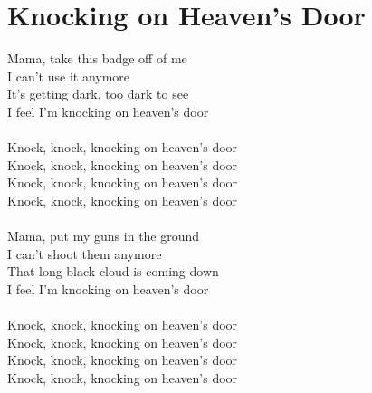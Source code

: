 \section{Knocking on Heaven's Door}
Mama, take this badge off of me\\
I can’t use it anymore\\
It’s getting dark, too dark to see\\
I feel I’m knocking on heaven’s door\\
\\
Knock, knock, knocking on heaven’s door\\
Knock, knock, knocking on heaven’s door\\
Knock, knock, knocking on heaven’s door\\
Knock, knock, knocking on heaven’s door\\
\\
Mama, put my guns in the ground\\
I can’t shoot them anymore\\
That long black cloud is coming down\\
I feel I’m knocking on heaven’s door\\
\\
Knock, knock, knocking on heaven’s door\\
Knock, knock, knocking on heaven’s door\\
Knock, knock, knocking on heaven’s door\\
Knock, knock, knocking on heaven’s door\\